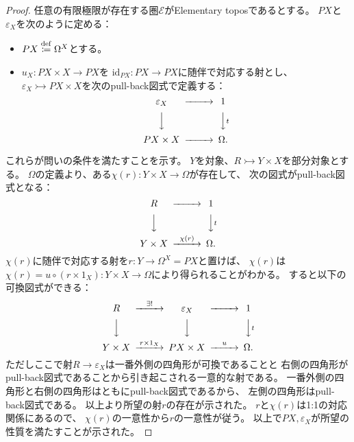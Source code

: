 \documentclass[uplatex]{jsarticle}
\theoremstyle{definition}
\def\ep{\varepsilon}
\def\id{\mathrm{id}}
\newcommand{\rtot}{\rightarrowtail}
\def\mcE{\mathcal{E}}
\newcommand{\dfn}{\overset{\mathrm{\tiny def}}{\coloneqq}}
\begin{document}
\begin{proof}
  任意の有限極限が存在する圏\(\mcE\)がElementary toposであるとする。
  \(PX\)と\(\ep_X\)を次のように定める：
  \begin{itemize}
    \item
    \(PX \dfn \Omega^X\)とする。
    \item
    \(u_X:PX \times X \to PX\)を
    \(\id_{PX}:PX\to PX\)に随伴で対応する射とし、
    \(\ep_X \rtot PX \times X\)を次のpull-back図式で定義する：
    \[
    \begin{CD}
      \ep_X @>>> 1 \\
      @VVV @VV t V \\
      PX \times X @>>> \Omega.
    \end{CD}
    \]
  \end{itemize}
  これらが問いの条件を満たすことを示す。
  \(Y\)を対象、\(R\rtot Y\times X\)を部分対象とする。
  \(\Omega\)の定義より、ある\(\chi(r): Y\times X \to \Omega\)が存在して、
  次の図式がpull-back図式となる：
  \[
  \begin{CD}
    R @>>> 1 \\
    @VVV @VV t V \\
    Y\times X @>\chi(r)>> \Omega.
  \end{CD}
  \]
  \(\chi(r)\)に随伴で対応する射を\(r:Y\to \Omega^X = PX\)と置けば、
  \(\chi(r)\)は\(\chi(r) = u\circ (r\times 1_X) : Y\times X \to \Omega\)により得られることがわかる。
  すると以下の可換図式ができる：
  \[
  \begin{CD}
    R @>\exists! >> \ep_X @>>> 1 \\
    @VVV @VVV @VV t V \\
    Y\times X @> r\times 1_X >> PX \times X @>u>> \Omega.
  \end{CD}
  \]
  ただしここで射\(R\to \ep_X\)は一番外側の四角形が可換であることと
  右側の四角形がpull-back図式であることから引き起こされる一意的な射である。
  一番外側の四角形と右側の四角形はともにpull-back図式であるから、
  左側の四角形はpull-back図式である。
  以上より所望の射\(r\)の存在が示された。
  \(r\)と\(\chi(r)\)は1:1の対応関係にあるので、
  \(\chi(r)\)の一意性から\(r\)の一意性が従う。
  以上で\(PX,\ep_X\)が所望の性質を満たすことが示された。


\end{proof}
\end{document}
